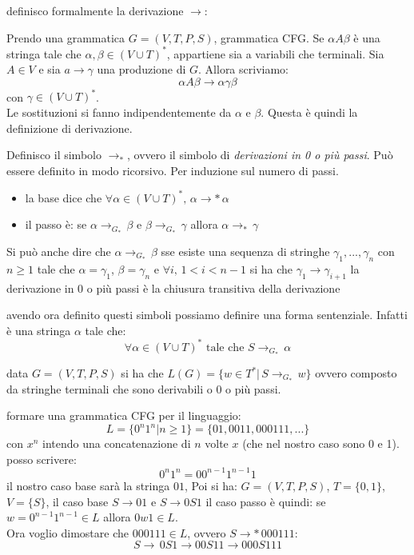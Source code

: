\documentclass[a4paper,12pt, oneside]{book}
\begin{document}
definisco formalmente la derivazione $\to$:
\begin{definizione}
	Prendo una grammatica $G=(V,T,P,S)$, grammatica CFG. Se $\alpha A \beta$ è una stringa tale che $\alpha,\beta\in (V\cup T)^*$, appartiene sia a variabili che terminali. Sia $A\in V$ e sia $a\to \gamma$ una produzione di $G$. Allora
	scriviamo:
	$$\alpha A \beta \to \alpha\gamma\beta$$
	con $\gamma\in (V\cup T)^*$.\\
	Le sostituzioni si fanno indipendentemente da $\alpha$ e $\beta$.
	Questa è quindi la definizione di derivazione.
\end{definizione}
\begin{definizione}
	Definisco il simbolo $\to _*$, ovvero il simbolo di \textit{derivazioni in 0 o più passi}. Può essere definito in modo ricorsivo. Per induzione sul numero di passi.
	\begin{itemize}
		\item la base dice che  $\forall \alpha\in (V\cup T)^*,\, \alpha\to * \,\alpha$
		\item il passo è: se $\alpha\to_{G_*} \,\beta $ e $ \beta \to_{G_*} \,\gamma$ allora $\alpha\to_* \,\gamma$
	\end{itemize}
	Si può anche dire che $\alpha\to_{G_*}\, \beta$ sse esiste una sequenza di stringhe $\gamma_1,...,\gamma_n$ con $n\geq 1$ tale che $\alpha=\gamma_1$, $\beta=\gamma_n$ e $\forall i,\, 1<i<n-1$ si ha che $\gamma_1\to \gamma_{i+1}$
	la derivazione in 0 o più passi è la chiusura transitiva della derivazione
\end{definizione}
\begin{definizione}
	avendo ora definito questi simboli possiamo definire una forma sentenziale. Infatti è una stringa $\alpha$ tale che:
	$$\forall \alpha\in (V\cup T)^* \mbox{ tale che }S\to_{G_*}\, \alpha$$
\end{definizione}
\begin{definizione}
	data $G=(V,T,P,S)$ si ha che $L(G)=\{w\in T^* |\, S\to_{G_*}\, w\}$ ovvero composto da stringhe terminali che sono derivabili o 0 o più passi.
\end{definizione}
\begin{esempio}
	formare una grammatica CFG per il linguaggio:
	$$L=\{0^n 1^n| n\geq 1\}=\{01, 0011, 000111,...\}$$
	con $x^n$ intendo una concatenazione di $n$ volte $x$ (che nel nostro caso sono 0 e 1).\\
	posso scrivere:
	$$0^n 1^n =00^{n-1} 1^{n-1}1$$
	il nostro caso base sarà la stringa $01$, Poi si ha:
	$G=(V,T,P,S)$, $T=\{0,1\}$, $V=\{S\}$, il caso base $S\to 01$  e $S\to 0S1$
	il caso passo è quindi: se $w= 0^{n-1}1^{n-1}\in L$ allora $0w1\in L$.\\
	Ora voglio dimostare che $000111\in L$, ovvero $S\to*\, 000111$:\\
	$$S\to\, 0S1 \to 00S11\to 000S111$$
\end{esempio}
\end{document}
